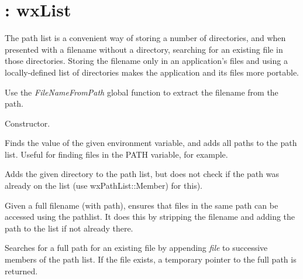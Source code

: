 \section{: wxList}\label{wxpathlist}

The path list is a convenient way of storing a number of directories, and
when presented with a filename without a directory, searching for an existing file
in those directories.  Storing the filename only in an application's files and
using a locally-defined list of directories makes the application and its files more
portable.

Use the {\it FileNameFromPath} global function to extract the filename
from the path.



Constructor.



Finds the value of the given environment variable, and adds all paths
to the path list. Useful for finding files in the PATH variable, for
example.



Adds the given directory to the path list, but does not
check if the path was already on the list (use wxPathList::Member)
for this).



Given a full filename (with path), ensures that files in the same path
can be accessed using the pathlist. It does this by stripping the
filename and adding the path to the list if not already there.



Searches for a full path for an existing file by appending {\it file} to
successive members of the path list.  If the file exists, a temporary
pointer to the full path is returned.



